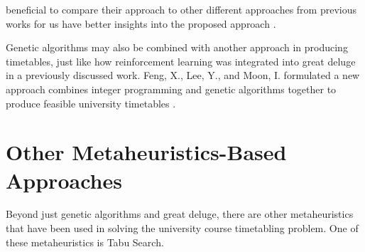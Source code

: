 beneficial to compare their approach to other different approaches from previous works for us have better insights into the proposed approach \cite{raghavjee-ga-south-africa}.

Genetic algorithms may also be combined with another approach in producing timetables, just like how reinforcement learning was integrated into great deluge in a previously discussed work. Feng, X., Lee, Y., and Moon, I. formulated a new approach combines integer programming and genetic algorithms together to produce feasible university timetables \cite{feng-integer-prog-ga}. %

\section{Other Metaheuristics-Based Approaches}
Beyond just genetic algorithms and great deluge, there are other metaheuristics that have been used in solving the university course timetabling problem. One of these metaheuristics is Tabu Search.

